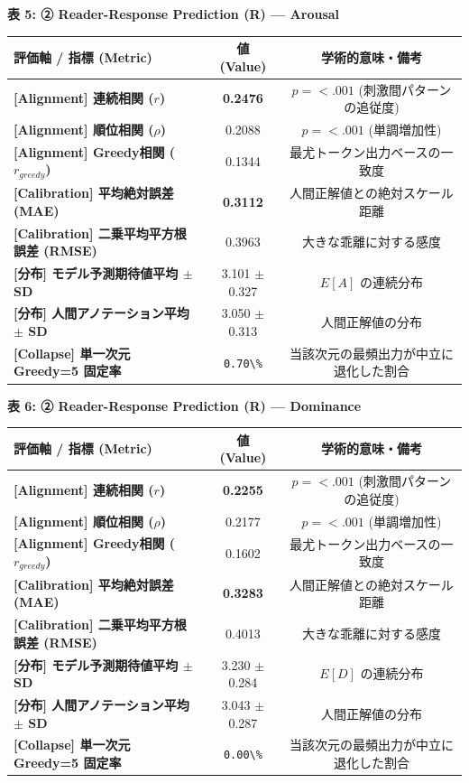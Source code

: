 \textbf{表 5: ② Reader-Response Prediction (R) — Arousal}
\begin{center}
\small
\begin{tabular}{lcc}
\toprule
\textbf{評価軸 / 指標 (Metric)} & \textbf{値 (Value)} & \textbf{学術的意味・備考} \\
\midrule
\textbf{[Alignment] 連続相関 ($r$)} & \textbf{0.2476} & $p = <.001 $ (刺激間パターンの追従度) \\
\textbf{[Alignment] 順位相関 ($\rho$)} & 0.2088 & $p = <.001 $ (単調増加性) \\
\textbf{[Alignment] Greedy相関 ($r_{greedy}$)} & 0.1344 & 最尤トークン出力ベースの一致度 \\
\textbf{[Calibration] 平均絶対誤差 (MAE)} & \textbf{0.3112} & 人間正解値との絶対スケール距離 \\
\textbf{[Calibration] 二乗平均平方根誤差 (RMSE)} & 0.3963 & 大きな乖離に対する感度 \\
\textbf{[分布] モデル予測期待値平均 $\pm$ SD} & 3.101 $\pm$ 0.327 & $E[A]$ の連続分布 \\
\textbf{[分布] 人間アノテーション平均 $\pm$ SD} & 3.050 $\pm$ 0.313 & 人間正解値の分布 \\
\textbf{[Collapse] 単一次元 Greedy=5 固定率} & \texttt{0.70\textbackslash{}\%} & 当該次元の最頻出力が中立に退化した割合 \\
\bottomrule
\end{tabular}
\end{center}


\textbf{表 6: ② Reader-Response Prediction (R) — Dominance}
\begin{center}
\small
\begin{tabular}{lcc}
\toprule
\textbf{評価軸 / 指標 (Metric)} & \textbf{値 (Value)} & \textbf{学術的意味・備考} \\
\midrule
\textbf{[Alignment] 連続相関 ($r$)} & \textbf{0.2255} & $p = <.001 $ (刺激間パターンの追従度) \\
\textbf{[Alignment] 順位相関 ($\rho$)} & 0.2177 & $p = <.001 $ (単調増加性) \\
\textbf{[Alignment] Greedy相関 ($r_{greedy}$)} & 0.1602 & 最尤トークン出力ベースの一致度 \\
\textbf{[Calibration] 平均絶対誤差 (MAE)} & \textbf{0.3283} & 人間正解値との絶対スケール距離 \\
\textbf{[Calibration] 二乗平均平方根誤差 (RMSE)} & 0.4013 & 大きな乖離に対する感度 \\
\textbf{[分布] モデル予測期待値平均 $\pm$ SD} & 3.230 $\pm$ 0.284 & $E[D]$ の連続分布 \\
\textbf{[分布] 人間アノテーション平均 $\pm$ SD} & 3.043 $\pm$ 0.287 & 人間正解値の分布 \\
\textbf{[Collapse] 単一次元 Greedy=5 固定率} & \texttt{0.00\textbackslash{}\%} & 当該次元の最頻出力が中立に退化した割合 \\
\bottomrule
\end{tabular}
\end{center}


